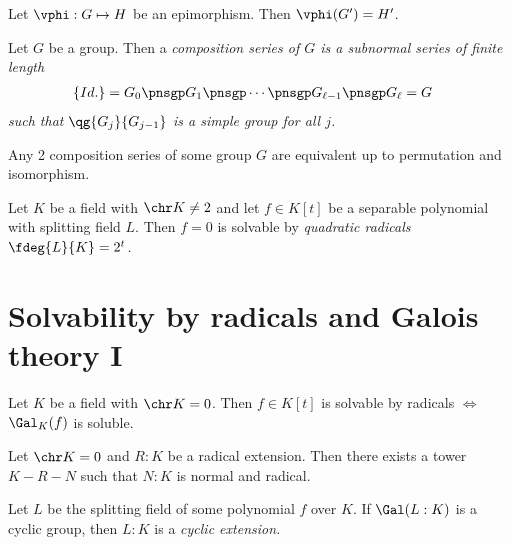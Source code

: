 \documentclass{article}
\begin{document}
\begin{tlemma}
  Let \( \vphi:G\mapsto H \) be an epimorphism.
  Then \( \vphi(G') = H' \).
\end{tlemma}

\begin{tdefinition}
  Let \( G \) be a group.
  Then a \it{composition series} of \( G \) is a subnormal series of finite length
  \begin{align*}
    \left\{ Id. \right\} &= G_0 \pnsgp G_{1} \pnsgp \cdots \pnsgp G_{\ell-1} \pnsgp G_\ell = G
  \end{align*}
  such that \( \qg{G_j}{G_{j-1}} \) is a simple group for all \( j \).
\end{tdefinition}

\begin{ttheorem}
  Any 2 composition series of some group \( G \) are equivalent up to permutation and isomorphism.
\end{ttheorem}

\begin{ttheorem}
  Let \( K \) be a field with \( \chr K \neq 2 \) and let \( f\in K[t] \) be a separable polynomial with splitting field \( L \).
  Then \( f=0 \) is solvable by \it{quadratic} radicals \iff~\( \fdeg{L}{K}=2^t \).
\end{ttheorem}

\section{Solvability by radicals and Galois theory I}

\begin{ttheorem}
  Let \( K \) be a field with \( \chr K = 0 \).
  Then \( f\in K[t] \) is solvable by radicals \( \iff \) \( \Gal_K(f) \) is soluble.
\end{ttheorem}

\begin{tlemma}
  Let \( \chr K = 0 \) and \( R:K \) be a radical extension.
  Then there exists a tower \( K-R-N \) such that \( N:K \) is normal and radical.
\end{tlemma}

\begin{tdefinition}
  Let \( L \) be the splitting field of some polynomial \( f \) over \( K \).
  If \( \Gal(L:K) \) is a cyclic group, then \( L:K \) is a \it{cyclic} extension.
\end{tdefinition}
\end{document}
